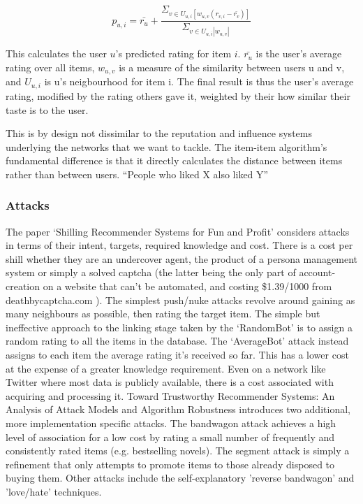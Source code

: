 \begin{equation*}
p_{u, i} = \bar{r_u} + \frac{\Sigma_{v \in U_{u, i} [w_{u, v}(r_{v, i} - \bar{r_v})]}}{\Sigma_{v\in U_{u, i} \left| w_{u, v} \right |}}
\end{equation*}

This calculates the user $u$'s predicted rating for item $i$. $\bar{r_u}$ is the user's average rating over all items, $w_{u, v}$ is a measure of the similarity between users u and v, and $U_{u, i}$ is u's neigbourhood for item i. The final result is thus the user's average rating, modified by the rating others gave it, weighted by their how similar their taste is to the user.

This is by design not dissimilar to the reputation and influence systems
underlying the networks that we want to tackle. The item-item algorithm's
fundamental difference is that it directly calculates the distance between items
rather than between users. ``People who liked X also liked Y''

\subsubsection{Attacks}

The paper `Shilling Recommender Systems for Fun and Profit' considers attacks in terms of their intent, targets, required knowledge and cost. There is a cost per shill whether they are an undercover agent, the product of a persona management system or simply a solved captcha (the latter being the only part of account-creation on a website that can't be automated, and costing \$1.39/1000 from deathbycaptcha.com ). The simplest push/nuke attacks revolve around gaining as many neighbours as possible, then rating the target item. The simple but ineffective approach to the linking stage taken by the `RandomBot' is to assign a random rating to all the items in the database. The `AverageBot' attack instead assigns to each item the average rating it's received so far. This has a lower cost at the expense of a greater knowledge requirement. Even on a network like Twitter where most data is publicly available, there is a cost associated with acquiring and processing it. Toward Trustworthy Recommender Systems: An Analysis of Attack Models and Algorithm Robustness introduces two additional, more implementation specific attacks. The bandwagon attack achieves a high level of association for a low cost by rating a small number of frequently and consistently rated items (e.g. bestselling novels).  The segment attack is simply a refinement that only attempts to promote items to those already disposed to buying them. Other attacks include the self-explanatory 'reverse bandwagon' and 'love/hate' techniques.

